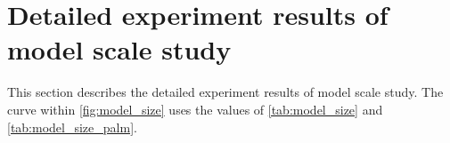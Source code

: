 \documentclass{article}
\begin{document}
\section{Detailed experiment results of model scale study}
\label{appx:detail_model_scale}
This section describes the detailed experiment results of model scale study. The curve within \autoref{fig:model_size} uses the values of \autoref{tab:model_size} and \autoref{tab:model_size_palm}.



\end{document}

